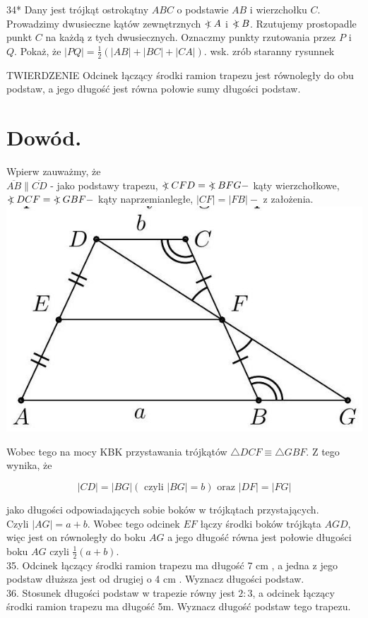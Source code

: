 \documentclass[10pt]{article}
\newcommand\Varangle{\mathop{{<\!\!\!\!\!\text{\small)}}\:}\nolimits}
\begin{document}
34* Dany jest trójkąt ostrokątny \(A B C\) o podstawie \(A B\) i wierzchołku \(C\). Prowadzimy dwusieczne kątów zewnętrznych \(\Varangle A\) i \(\Varangle B\). Rzutujemy prostopadle punkt \(C\) na każdą z tych dwusiecznych. Oznaczmy punkty rzutowania przez \(P\) i \(Q\). Pokaż, że \(|P Q|=\frac{1}{2}(|A B|+|B C|+|C A|)\). wsk. zrób staranny rysunnek

TWIERDZENIE Odcinek łączący środki ramion trapezu jest równoległy do obu podstaw, a jego długość jest równa połowie sumy długości podstaw.

\section*{Dowód.}
Wpierw zauważmy, że\\
\(\overline{A B} \| \overline{C D}\) - jako podstawy trapezu, \(\Varangle C F D=\Varangle B F G-\) kąty wierzchołkowe, \(\Varangle D C F=\Varangle G B F-\) kąty naprzemianległe, \(|C F|=|F B|-\) z założenia.\\
\includegraphics[max width=\textwidth, center]{2024_11_21_e9b4faa005d5be2cc318g-015}

Wobec tego na mocy KBK przystawania trójkątów \(\triangle D C F \equiv \triangle G B F\). Z tego wynika, że

\[
|C D|=|B G|(\text { czyli }|B G|=b) \text { oraz }|D F|=|F G|
\]

jako długości odpowiadających sobie boków w trójkątach przystających.\\
Czyli \(|A G|=a+b\). Wobec tego odcinek \(E F\) łączy środki boków trójkąta \(A G D\), więc jest on równoległy do boku \(A G\) a jego długość równa jest połowie długości boku \(A G\) czyli \(\frac{1}{2}(a+b)\).\\
35. Odcinek łączący środki ramion trapezu ma długość 7 cm , a jedna z jego podstaw dłuższa jest od drugiej o 4 cm . Wyznacz długości podstaw.\\
36. Stosunek długości podstaw w trapezie równy jest \(2: 3\), a odcinek łączący środki ramion trapezu ma długość 5m. Wyznacz długość podstaw tego trapezu.
\end{document}

